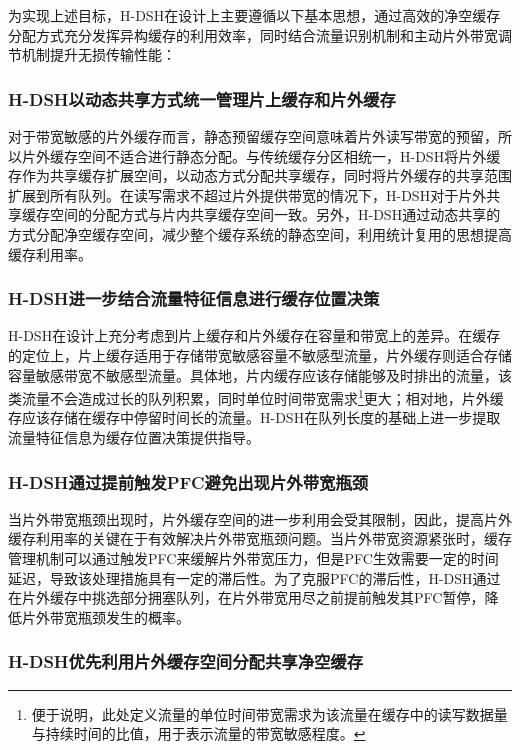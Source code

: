 为实现上述目标，H-DSH在设计上主要遵循以下基本思想，通过高效的净空缓存分配方式充分发挥异构缓存的利用效率，同时结合流量识别机制和主动片外带宽调节机制提升无损传输性能：

\subsubsection{H-DSH以动态共享方式统一管理片上缓存和片外缓存}

对于带宽敏感的片外缓存而言，静态预留缓存空间意味着片外读写带宽的预留，所以片外缓存空间不适合进行静态分配。与传统缓存分区相统一，H-DSH将片外缓存作为共享缓存扩展空间，以动态方式分配共享缓存，同时将片外缓存的共享范围扩展到所有队列。在读写需求不超过片外提供带宽的情况下，H-DSH对于片外共享缓存空间的分配方式与片内共享缓存空间一致。另外，H-DSH通过动态共享的方式分配净空缓存空间，减少整个缓存系统的静态空间，利用统计复用的思想提高缓存利用率。

\subsubsection{H-DSH进一步结合流量特征信息进行缓存位置决策}

H-DSH在设计上充分考虑到片上缓存和片外缓存在容量和带宽上的差异。在缓存的定位上，片上缓存适用于存储带宽敏感容量不敏感型流量，片外缓存则适合存储容量敏感带宽不敏感型流量。具体地，片内缓存应该存储能够及时排出的流量，该类流量不会造成过长的队列积累，同时单位时间带宽需求\footnote{便于说明，此处定义流量的单位时间带宽需求为该流量在缓存中的读写数据量与持续时间的比值，用于表示流量的带宽敏感程度。}更大；相对地，片外缓存应该存储在缓存中停留时间长的流量。H-DSH在队列长度的基础上进一步提取流量特征信息为缓存位置决策提供指导。

\subsubsection{H-DSH通过提前触发PFC避免出现片外带宽瓶颈}

当片外带宽瓶颈出现时，片外缓存空间的进一步利用会受其限制，因此，提高片外缓存利用率的关键在于有效解决片外带宽瓶颈问题。当片外带宽资源紧张时，缓存管理机制可以通过触发PFC来缓解片外带宽压力，但是PFC生效需要一定的时间延迟，导致该处理措施具有一定的滞后性。为了克服PFC的滞后性，H-DSH通过在片外缓存中挑选部分拥塞队列，在片外带宽用尽之前提前触发其PFC暂停，降低片外带宽瓶颈发生的概率。

\subsubsection{H-DSH优先利用片外缓存空间分配共享净空缓存}

